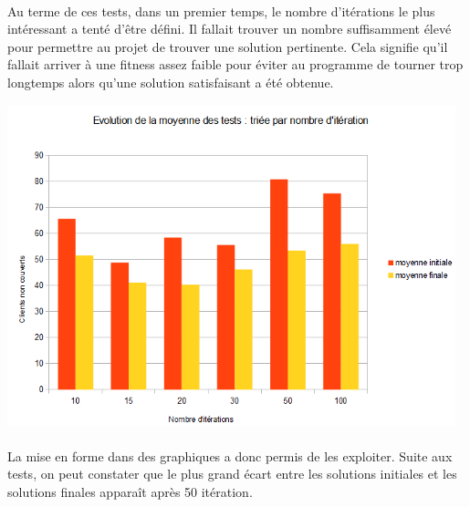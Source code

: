 \documentclass[a4paper, 11pt]{report}
\begin{document}
    \paragraph{}Au terme de ces tests, dans un premier temps, le nombre d'itérations le plus intéressant a tenté d'être défini. Il fallait trouver un nombre suffisamment élevé pour permettre au
projet de trouver une solution pertinente. Cela signifie qu'il fallait arriver à une fitness assez faible pour éviter au programme de tourner trop
    longtemps alors qu'une solution satisfaisant a été obtenue.  
    \begin{center} \includegraphics[width=13cm]{tableau_nombre_iteration} \end{center}
    \paragraph{} La mise en forme dans des graphiques a donc permis de les exploiter. Suite aux tests, on peut constater que le plus grand écart entre les solutions
    initiales et les solutions finales apparaît après 50 itération.
\end{document}
